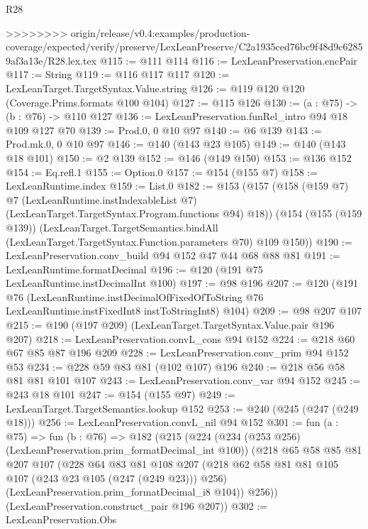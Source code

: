 \begin{lexlean}{R28}
\begin{coremodule}
{{{{{>>>>>>>> origin/release/v0.4:examples/production-coverage/expected/verify/preserve/LexLeanPreserve/C2a1935ced76bc9f48d9c62859af3a13e/R28.lex.tex
@115 := @111 @114
@116 := LexLeanPreservation.encPair
@117 := String
@119 := @116 @117 @117
@120 := LexLeanTarget.TargetSyntax.Value.string
@126 := @119 @120 @120 (Coverage.Prims.formats @100 @104)
@127 := @115 @126
@130 := (a : @75) -> (b : @76) -> @110 @127
@136 := LexLeanPreservation.funRel_intro @94 @18 @109 @127 @70
@139 := Prod.{0, 0} @10 @97
@140 := @6 @139
@143 := Prod.mk.{0, 0} @10 @97
@146 := @140 (@143 @23 @105)
@149 := @140 (@143 @18 @101)
@150 := @2 @139
@152 := @146 (@149 @150)
@153 := @136 @152
@154 := Eq.refl.{1}
@155 := Option.{0}
@157 := @154 (@155 @7)
@158 := LexLeanRuntime.index
@159 := List.{0}
@182 := @153
    (@157
      (@158
        (@159 @7)
        @7
        (LexLeanRuntime.instIndexableList @7)
        (LexLeanTarget.TargetSyntax.Program.functions @94)
        @18))
    (@154
      (@155 (@159 @139))
      (LexLeanTarget.TargetSemantics.bindAll
        (LexLeanTarget.TargetSyntax.Function.parameters @70)
        @109
        @150))
@190 := LexLeanPreservation.conv_build @94 @152 @47 @44 @68 @88 @81
@191 := LexLeanRuntime.formatDecimal
@196 := @120 (@191 @75 LexLeanRuntime.instDecimalInt @100)
@197 := @98 @196
@207 := @120
    (@191
      @76
      (LexLeanRuntime.instDecimalOfFixedOfToString
        @76
        LexLeanRuntime.instFixedInt8
        instToStringInt8)
      @104)
@209 := @98 @207 @107
@215 := @190 (@197 @209) (LexLeanTarget.TargetSyntax.Value.pair @196 @207)
@218 := LexLeanPreservation.convL_cons @94 @152
@224 := @218 @60 @67 @85 @87 @196 @209
@228 := LexLeanPreservation.conv_prim @94 @152 @53
@234 := @228 @59 @83 @81 (@102 @107) @196
@240 := @218 @56 @58 @81 @81 @101 @107
@243 := LexLeanPreservation.conv_var @94 @152
@245 := @243 @18 @101
@247 := @154 (@155 @97)
@249 := LexLeanTarget.TargetSemantics.lookup @152
@253 := @240 (@245 (@247 (@249 @18)))
@256 := LexLeanPreservation.convL_nil @94 @152
@301 := fun (a : @75) =>
  fun (b : @76) =>
  @182
    (@215
      (@224
        (@234 (@253 @256) (LexLeanPreservation.prim_formatDecimal_int @100))
        (@218
          @65
          @58
          @85
          @81
          @207
          @107
          (@228
            @64
            @83
            @81
            @108
            @207
            (@218 @62 @58 @81 @81 @105 @107 (@243 @23 @105 (@247 (@249 @23))) @256)
            (LexLeanPreservation.prim_formatDecimal_i8 @104))
          @256))
      (LexLeanPreservation.construct_pair @196 @207))
@302 := LexLeanPreservation.Obs
}}}}}
\end{coremodule}
\end{lexlean}
